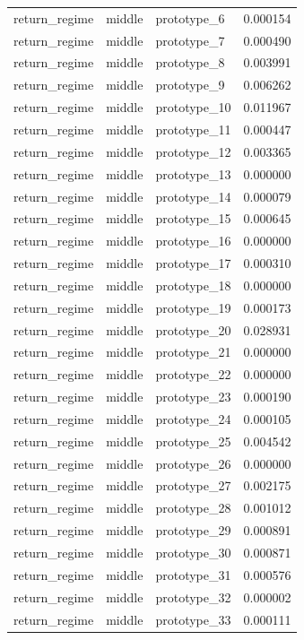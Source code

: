\begin{tabular}{lllr}
return\_regime & middle & prototype\_6 & 0.000154 \\
return\_regime & middle & prototype\_7 & 0.000490 \\
return\_regime & middle & prototype\_8 & 0.003991 \\
return\_regime & middle & prototype\_9 & 0.006262 \\
return\_regime & middle & prototype\_10 & 0.011967 \\
return\_regime & middle & prototype\_11 & 0.000447 \\
return\_regime & middle & prototype\_12 & 0.003365 \\
return\_regime & middle & prototype\_13 & 0.000000 \\
return\_regime & middle & prototype\_14 & 0.000079 \\
return\_regime & middle & prototype\_15 & 0.000645 \\
return\_regime & middle & prototype\_16 & 0.000000 \\
return\_regime & middle & prototype\_17 & 0.000310 \\
return\_regime & middle & prototype\_18 & 0.000000 \\
return\_regime & middle & prototype\_19 & 0.000173 \\
return\_regime & middle & prototype\_20 & 0.028931 \\
return\_regime & middle & prototype\_21 & 0.000000 \\
return\_regime & middle & prototype\_22 & 0.000000 \\
return\_regime & middle & prototype\_23 & 0.000190 \\
return\_regime & middle & prototype\_24 & 0.000105 \\
return\_regime & middle & prototype\_25 & 0.004542 \\
return\_regime & middle & prototype\_26 & 0.000000 \\
return\_regime & middle & prototype\_27 & 0.002175 \\
return\_regime & middle & prototype\_28 & 0.001012 \\
return\_regime & middle & prototype\_29 & 0.000891 \\
return\_regime & middle & prototype\_30 & 0.000871 \\
return\_regime & middle & prototype\_31 & 0.000576 \\
return\_regime & middle & prototype\_32 & 0.000002 \\
return\_regime & middle & prototype\_33 & 0.000111 \\

\end{tabular}
